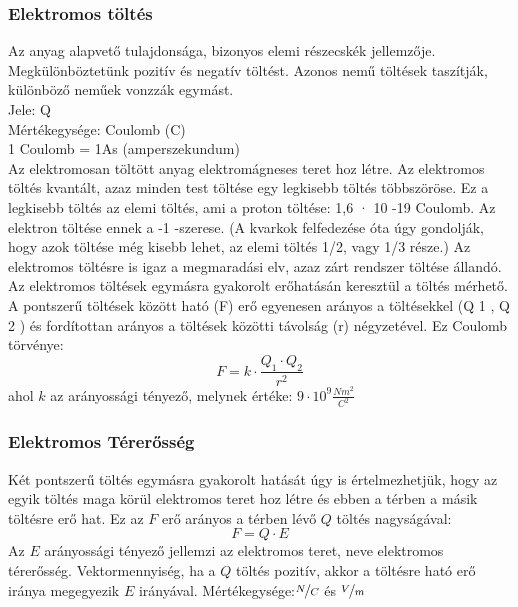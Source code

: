 \subsubsection{Elektromos töltés}
Az anyag alapvető tulajdonsága, bizonyos elemi részecskék jellemzője. Megkülönböztetünk pozitív és negatív töltést. Azonos nemű töltések taszítják, különböző neműek vonzzák egymást.\\
Jele: Q\\
Mértékegysége: Coulomb (C)\\
1 Coulomb = 1As (amperszekundum)\\
Az elektromosan töltött anyag elektromágneses teret hoz létre. Az elektromos töltés kvantált, azaz minden test töltése egy legkisebb töltés többszöröse. Ez a legkisebb töltés az elemi töltés, ami a proton töltése: 1,6 · 10 -19 Coulomb. Az elektron töltése ennek a -1 -szerese. (A kvarkok felfedezése óta úgy gondolják, hogy azok töltése még kisebb lehet, az elemi töltés 1/2, vagy 1/3 része.) Az elektromos töltésre is igaz a megmaradási elv, azaz zárt rendszer töltése állandó. Az elektromos töltések egymásra gyakorolt erőhatásán keresztül a töltés mérhető. A pontszerű töltések között ható (F) erő egyenesen arányos a töltésekkel (Q 1 , Q 2 ) és fordítottan arányos a töltések közötti
távolság (r) négyzetével. Ez Coulomb törvénye:
$$F=k\cdot\frac{Q_1 \cdot Q_2}{r^2}$$
ahol $k$ az arányossági tényező, melynek értéke: $9\cdot10^9 \frac{Nm^2}{C^2}$

\subsubsection{Elektromos Térerősség}
Két pontszerű töltés egymásra gyakorolt hatását úgy is értelmezhetjük, hogy az egyik töltés maga körül elektromos teret hoz létre és ebben a térben a másik töltésre erő hat. Ez az $F$ erő arányos a térben lévő $Q$ töltés nagyságával:
$$F=Q\cdot E$$
Az $E$ arányossági tényező jellemzi az elektromos teret, neve elektromos térerősség. Vektormennyiség, ha a $Q$ töltés pozitív, akkor a töltésre ható erő iránya megegyezik $E$ irányával.
Mértékegysége:$\nicefrac{N}{C}$ és $\nicefrac{V}{m}$

